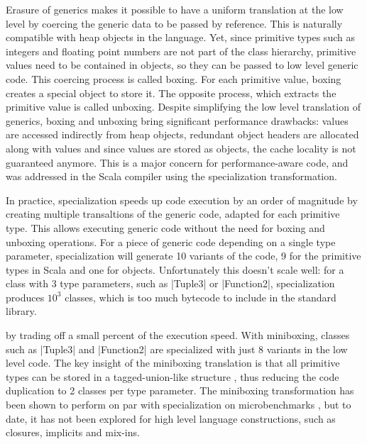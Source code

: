  Erasure of generics makes it possible to have a uniform translation at the low level by coercing the generic data to be passed by reference. This is naturally compatible with heap objects in the language. Yet, since primitive types such as integers and floating point numbers are not part of the class hierarchy, primitive values need to be contained in objects, so they can be passed to low level generic code. This coercing process is called boxing. For each primitive value, boxing creates a special object to store it. The opposite process, which extracts the primitive value is called unboxing. Despite simplifying the low level translation of generics, boxing and unboxing bring significant performance drawbacks: values are accessed indirectly from heap objects, redundant object headers are allocated along with values and since values are stored as objects, the cache locality is not guaranteed anymore. This is a major concern for performance-aware code, and was addressed in the Scala compiler using the specialization transformation.

 In practice, specialization speeds up code execution by an order of magnitude \cite{erik-spire} by creating multiple transaltions of the generic code, adapted for each primitive type. This allows executing generic code without the need for boxing and unboxing operations. For a piece of generic code depending on a single type parameter, specialization will generate 10 variants of the code, 9 for the primitive types in Scala and one for objects. Unfortunately this doesn't scale well: for a class with 3 type parameters, such as |Tuple3| or |Function2|, specialization produces $10^3$ classes, which is too much bytecode to include in the standard library.

 by trading off a small percent of the execution speed. With miniboxing, classes such as |Tuple3| and |Function2| are specialized with just 8 variants in the low level code. The key insight of the miniboxing translation is that all primitive types can be stored in a tagged-union-like structure \cite{tagged-unions-lua}, thus reducing the code duplication to 2 classes per type parameter. The miniboxing transformation has been shown to perform on par with specialization on microbenchmarks \cite{miniboxing}, but to date, it has not been explored for high level language constructions, such as closures, implicits and mix-ins.

